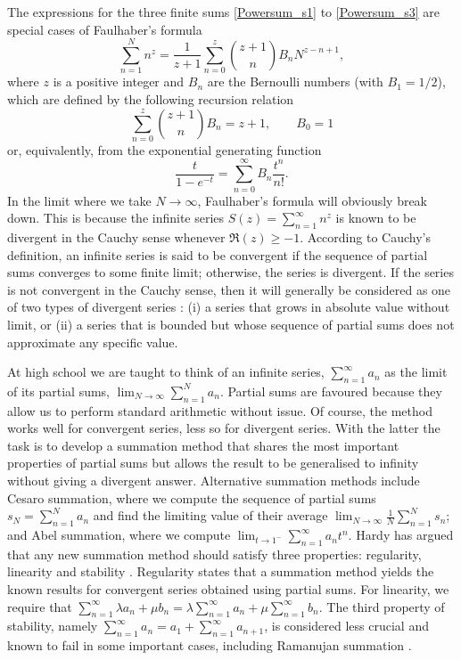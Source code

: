 \documentclass[11pt, letter]{article}
\def\be{\begin{equation}}
\def\ee{\end{equation}}
\begin{document}
The expressions for the three finite sums  \eqref{Powersum_s1} to \eqref{Powersum_s3} are special cases of Faulhaber's formula \cite{Knuth_1993}
\begin{equation} \label{Faul}
\sum_{n=1}^N n^z=\frac{1}{z+1} \sum_{n=0}^z \binom{z+1}{n}  B_n N^{z-n+1},
\end{equation}
where $z$ is a positive integer and $B_n$ are the Bernoulli numbers (with $B_1= 1/2$), which are defined  by the following recursion relation
\be \label{recursion}
\sum_{n=0}^{z} \binom{z+1}{ n} B_{n}=z+1, \qquad B_0=1
\ee
or, equivalently, from  the exponential generating function
\be
\frac{t}{1-e^{-t}}=\sum_{n=0}^\infty B_n \frac{t^n}{n!}.
\ee
In the limit where we take $N \to \infty$, Faulhaber's formula will obviously break down.  This is because the infinite series $S(z)=\sum_{n=1}^\infty n^z$ is known to be divergent in the Cauchy sense  whenever $\Re(z) \geq -1$. According to Cauchy's definition,  an infinite series is said to be convergent if the sequence of partial sums converges to some finite limit; otherwise, the series is divergent. If the series is not convergent in the Cauchy sense, then it will generally be considered as one of two types of divergent series \citep{Hardy73,Graham91ConcreteMaths}: (i) a series that grows in absolute value without limit,  or (ii) a series that is bounded but whose sequence of partial sums does not approximate any specific value. 

At high school we are taught to think of an infinite series, $\sum_{n=1}^\infty a_n$ as the limit of its partial sums, $\lim_{N\to\infty} \sum_{n=1}^N a_n$.  Partial sums are favoured because  they allow us to  perform  standard arithmetic without issue. Of course, the method works well for convergent series, less so for divergent series.  With the latter the task is to develop a summation method that shares the most important properties of partial sums but allows the result to be generalised to infinity without giving a divergent answer.  Alternative summation methods include Cesaro summation, where we compute the sequence of partial sums $s_N=\sum_{n=1}^N a_n$ and find the limiting value of their average $\lim_{N \to \infty} \frac{1}{N}\sum_{n=1}^N s_n$; and Abel summation, where we compute $\lim_{t \to 1^-} \sum_{n=1}^\infty a_n t^n$. Hardy has argued that any new summation method should satisfy three properties: regularity, linearity and stability \citep{Hardy73}. Regularity states that a summation method yields the known results for convergent series obtained using partial sums. For linearity, we  require that $\sum_{n = 1 }^\infty {\lambda a_n+\mu b_n=}\lambda \sum_{n = 1 }^\infty a_n+\mu \sum_{n = 1 }^\infty b_n$.  The third property of stability, namely  $\sum_{n = 1 }^\infty a_n =a_1+\sum_{n = 1 }^\infty a_{n+1}$,  is considered less crucial and known to fail in some important cases, including Ramanujan summation \citep{Candelpergher17}.  
\end{document}
